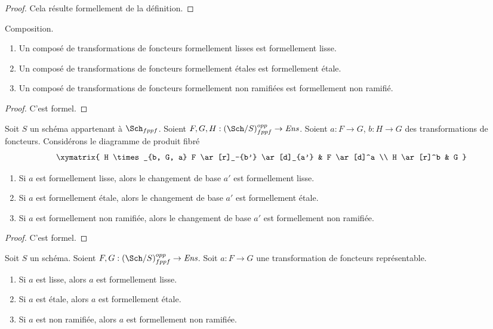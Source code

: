 \begin{proof}
Cela résulte formellement de la définition.
\end{proof}

\begin{lemma}
\label{lemma-composition-formally-smooth-etale-unramified}
Composition.
\begin{enumerate}
\item Un composé de transformations de foncteurs formellement lisses est formellement
lisse.
\item Un composé de transformations de foncteurs formellement étales est formellement
étale.
\item Un composé de transformations de foncteurs formellement non ramifiées est
formellement non ramifié.
\end{enumerate}
\end{lemma}

\begin{proof}
C'est formel.
\end{proof}

\begin{lemma}
\label{lemma-base-change-formally-smooth-etale-unramified}
Soit $S$ un schéma appartenant à $\Sch_{fppf}$.
Soient $F, G, H : (\Sch/S)_{fppf}^{opp} \to \textit{Ens}$.
Soient $a : F \to G$, $b : H \to G$ des transformations de foncteurs.
Considérons le diagramme de produit fibré
$$
\xymatrix{
H \times_{b, G, a} F \ar[r]_-{b'} \ar[d]_{a'} & F \ar[d]^a \\
H \ar[r]^b & G
}
$$
\begin{enumerate}
\item Si $a$ est formellement lisse, alors le changement de base $a'$ est
formellement lisse.
\item Si $a$ est formellement étale, alors le changement de base $a'$ est
formellement étale.
\item Si $a$ est formellement non ramifiée, alors le changement de base $a'$ est
formellement non ramifiée.
\end{enumerate}
\end{lemma}

\begin{proof}
C'est formel.
\end{proof}

\begin{lemma}
\label{lemma-representable-property-formally-property}
Soit $S$ un schéma.
Soient $F, G : (\Sch/S)_{fppf}^{opp} \to \textit{Ens}$.
Soit $a : F \to G$ une transformation de foncteurs représentable.
\begin{enumerate}
\item Si $a$ est lisse, alors $a$ est formellement lisse.
\item Si $a$ est étale, alors $a$ est formellement étale.
\item Si $a$ est non ramifiée, alors $a$ est formellement non ramifiée.
\end{enumerate}
\end{lemma}

